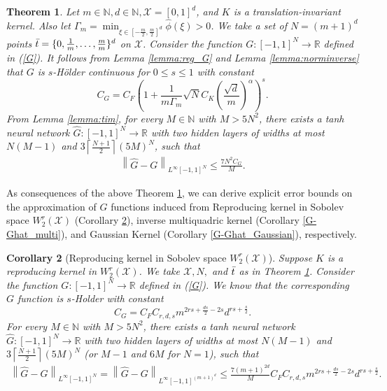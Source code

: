 \documentclass{article}
\def\NN{\mathbb N}
\def\RR{\mathbb R}
\numberwithin{equation}{section}
\newtheorem{theorem}{Theorem}[section]
\newtheorem{corollary}[theorem]{Corollary}
\begin{document}
\begin{theorem}\label{thm:app_G}
Let $m\in \NN, d\in \NN, \mathcal{X}=[0,1]^d$, and $K$ is a translation-invariant kernel. 
Also let $\Gamma_m =  \min_{\xi \in [-\frac{m}{2},\frac{m}{2}]^d} \widehat{\phi}(\xi)> 0$.
We take a set of $N=(m+1)^d$ points $\Bar{t}=\{0, \frac{1}{m},\ldots, \frac{m}{m}\}^d$ on $\mathcal{X}$.
Consider the function $G:[-1,1]^N \rightarrow \RR$ defined in (\ref{G}). 
It follows from Lemma \ref{lemma:reg_G} and Lemma \ref{lemma:norminverse} that $G$ is $s$-H\"{o}lder continuous for $0 \leq s \leq 1$ with constant $$C_G= C_F\left(1+ \frac{1}{m\Gamma_m}\sqrt{N} C_K \left(\frac{\sqrt{d}}{m}\right)^\alpha\right)^s.$$
From Lemma \ref{lemma:tim}, for every $M\in \NN$ with $M>5N^2$, there exists a tanh neural network $\widehat{G}:[-1,1]^N \rightarrow \RR$ with two hidden layers of widths at most $N(M-1)$ and $3\left\lceil \frac{N+1}{2} \right\rceil (5M)^N$, such that 
\begin{eqnarray*}
   \left \|\widehat{G}-G\right\|_{L^\infty [-1,1]^N} \leq \frac{7N^2C_G}{M}. 
\end{eqnarray*}

\end{theorem}
As consequences of the above Theorem \ref{thm:app_G}, we can derive explicit error bounds on the approximation of $G$ functions induced from Reproducing kernel in Sobolev space $W^r_2(\mathcal{X})$ (Corollary \ref{G-Ghat_Sob}), inverse multiquadric kernel (Corollary \ref{G-Ghat_multi}), and Gaussian Kernel (Corollary \ref{G-Ghat_Gaussian}), respectively.  

\begin{corollary}[Reproducing kernel in Sobolev space $W^r_2(\mathcal{X})$]\label{G-Ghat_Sob}
Suppose $K$ is a reproducing kernel in $W^r_2(\mathcal{X})$. 
We take $\mathcal{X}, N,$ and $\Bar{t}$ as in Theorem \ref{thm:app_G}.
Consider the function $G:[-1,1]^N \rightarrow \RR$ defined in (\ref{G}).
We know that the corresponding $G$ function is $s$-Holder with constant $$C_G =  C_F C_{r,d,s} m^{2rs+\frac{ds}{2}-2s} d^{rs+\frac{s}{2}}.$$
For every $M\in \NN$ with $M>5N^2$, there exists a tanh neural network $\widehat{G}:[-1,1]^N \rightarrow \RR$ with two hidden layers of widths at most $N(M-1)$ and $3\left\lceil \frac{N+1}{2} \right\rceil (5M)^N$ (or $M-1$ and $6M$ for $N=1$), such that 
\begin{eqnarray*}
    \left\|\widehat{G}-G\right\|_{L^\infty [-1,1]^N} =  \left\|\widehat{G}-G\right\|_{L^\infty [-1,1]^{(m+1)^{d}}} \leq \frac{7(m+1)^{2d}}{M}C_F C_{r,d,s} m^{2rs+\frac{ds}{2}-2s} d^{rs+\frac{s}{2}}. 
\end{eqnarray*}
\end{corollary}
\end{document}

